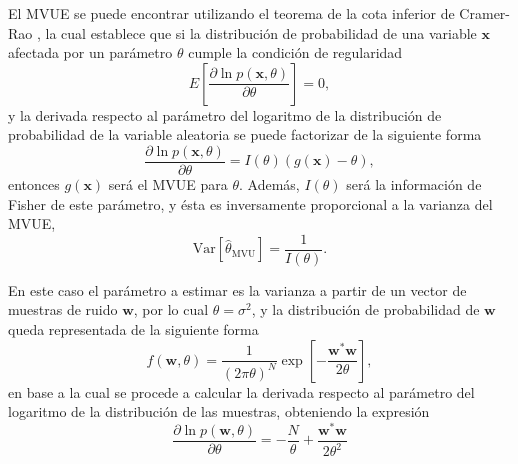 El MVUE se puede encontrar utilizando el teorema de la cota inferior de Cramer-Rao \cite{kay}, la cual establece que si la distribución de probabilidad de una variable $\mathbf{x}$ afectada por un parámetro $\theta$ cumple la condición de regularidad
\begin{equation}
    E\left[\frac{\partial \ln p(\mathbf{x},\theta)}{\partial \theta}\right] = 0,
\end{equation}
y la derivada respecto al parámetro del logaritmo de la distribución de probabilidad de la variable aleatoria se puede factorizar de la siguiente forma
\begin{equation}\label{eq:cramer-rao}
    \frac{\partial \ln p(\mathbf{x},\theta)}{\partial \theta} = I(\theta)\left(g(\mathbf{x})-\theta\right),
\end{equation}
entonces $g(\mathbf{x})$ será el MVUE para $\theta$. Además, $I(\theta)$ será la información de Fisher de este parámetro, y ésta es inversamente proporcional a la varianza del MVUE,
\begin{equation}\label{eq:var-mvue}
    \text{Var}[\widehat{\theta}_{\text{MVU}}] = \frac{1}{I(\theta)}.
\end{equation}

En este caso el parámetro a estimar es la varianza a partir de un vector de muestras de ruido $\mathbf{w}$, por lo cual $\theta = \sigma^2$, y la distribución de probabilidad de $\mathbf{w}$ queda representada de la siguiente forma 
\begin{equation}\label{eq:noise-estimation-distribution}
    f(\mathbf{w}, \theta) = \frac{1}{\left(2\pi\theta\right)^N} \exp\left[- \frac{\mathbf{w}^\ast \mathbf{w}}{2\theta}\right],
\end{equation}
en base a la cual se procede a calcular la derivada respecto al parámetro del logaritmo de la distribución de las muestras, obteniendo la expresión
\begin{equation}\label{eq:logaritmo-derivada}
\frac{\partial \ln p(\mathbf{w},\theta)}{\partial \theta} =  - \frac{N}{ \theta} +\frac{\mathbf{w}^\ast\mathbf{w}}{2\theta^2}
\end{equation}

